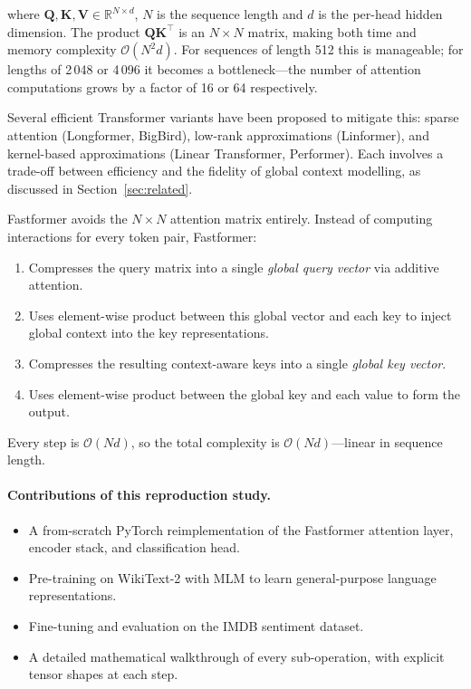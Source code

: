 \documentclass[11pt,a4paper]{article}
\newcommand{\mat}[1]{\mathbf{#1}}
\newcommand{\R}{\mathbb{R}}
\theoremstyle{definition}
\begin{document}
\noindent where $\mat{Q},\mat{K},\mat{V}\in\R^{N\times d}$, $N$ is the sequence length and $d$
is the per-head hidden dimension.
The product $\mat{Q}\mat{K}^{\top}$ is an $N\times N$ matrix, making both time and memory
complexity $\mathcal{O}(N^{2}d)$.
For sequences of length 512 this is manageable; for lengths of 2\,048 or 4\,096 it becomes a
bottleneck---the number of attention computations grows by a factor of 16 or 64 respectively.

Several efficient Transformer variants have been proposed to mitigate this: sparse attention
(Longformer, BigBird), low-rank approximations (Linformer), and kernel-based approximations
(Linear Transformer, Performer).
Each involves a trade-off between efficiency and the fidelity of global context modelling,
as discussed in Section~\ref{sec:related}.

Fastformer avoids the $N\times N$ attention matrix entirely.
Instead of computing interactions for every token pair, Fastformer:
\begin{enumerate}[noitemsep]
  \item Compresses the query matrix into a single \emph{global query vector} via additive
        attention.
  \item Uses element-wise product between this global vector and each key to inject global
        context into the key representations.
  \item Compresses the resulting context-aware keys into a single \emph{global key vector}.
  \item Uses element-wise product between the global key and each value to form the output.
\end{enumerate}
Every step is $\mathcal{O}(Nd)$, so the total complexity is $\mathcal{O}(Nd)$---linear in
sequence length.

\paragraph{Contributions of this reproduction study.}
\begin{itemize}[noitemsep]
  \item A from-scratch PyTorch reimplementation of the Fastformer attention layer, encoder
        stack, and classification head.
  \item Pre-training on WikiText-2 with MLM to learn general-purpose language representations.
  \item Fine-tuning and evaluation on the IMDB sentiment dataset.
  \item A detailed mathematical walkthrough of every sub-operation, with explicit tensor shapes
        at each step.
\end{itemize}
\end{document}
